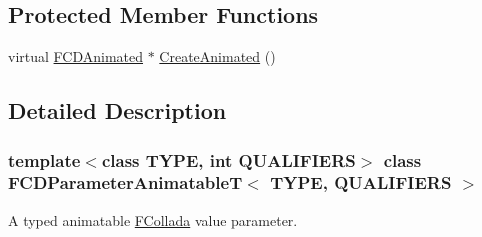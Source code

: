 \subsection*{Protected Member Functions}
\begin{DoxyCompactItemize}
\item 
virtual \hyperlink{classFCDAnimated}{FCDAnimated} $\ast$ \hyperlink{classFCDParameterAnimatableT_acdffb22b8c67c115468191f7c0e9fd52}{CreateAnimated} ()
\end{DoxyCompactItemize}


\subsection{Detailed Description}
\subsubsection*{template$<$class TYPE, int QUALIFIERS$>$ class FCDParameterAnimatableT$<$ TYPE, QUALIFIERS $>$}

A typed animatable \hyperlink{namespaceFCollada}{FCollada} value parameter. 

